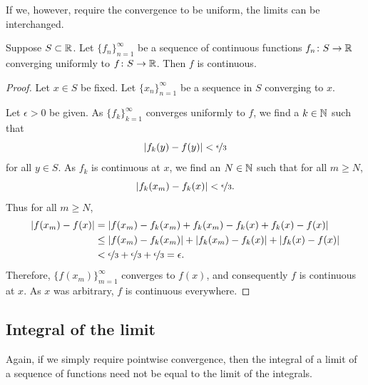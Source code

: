 If we, however, require the convergence to be uniform, the limits can
be interchanged.

\begin{thm}
Suppose $S \subset {\mathbb{R}}$.
Let $\{ f_n \}_{n=1}^\infty$ be 
a sequence of continuous functions $f_n \colon S \to {\mathbb{R}}$ converging
uniformly to  $f \colon S \to {\mathbb{R}}$.  Then $f$ is continuous.
\end{thm}

\begin{proof}
Let $x \in S$ be fixed.  Let $\{ x_n \}_{n=1}^\infty$ be a sequence in $S$
converging to $x$.

Let $\epsilon > 0$ be given.
As $\{ f_k \}_{k=1}^\infty$ converges uniformly to $f$, we find a $k \in {\mathbb{N}}$ such that
\begin{equation*}
\left\lvert {f_k(y)-f(y)} \right\rvert < \nicefrac{\epsilon}{3}
\end{equation*}
for all $y \in S$.  As $f_k$ is continuous at $x$,
we find an $N \in {\mathbb{N}}$ such that for all $m \geq N$,
\begin{equation*}
\left\lvert {f_k(x_m)-f_k(x)} \right\rvert < \nicefrac{\epsilon}{3} .
\end{equation*}
Thus for all
$m \geq N$,
\begin{equation*}
\begin{split}
\left\lvert {f(x_m)-f(x)} \right\rvert
& =
\left\lvert {f(x_m)-f_k(x_m)+f_k(x_m)-f_k(x)+f_k(x)-f(x)} \right\rvert
\\
& \leq
\left\lvert {f(x_m)-f_k(x_m)} \right\rvert+
\left\lvert {f_k(x_m)-f_k(x)} \right\rvert+
\left\lvert {f_k(x)-f(x)} \right\rvert
\\
& <
\nicefrac{\epsilon}{3} +
\nicefrac{\epsilon}{3} +
\nicefrac{\epsilon}{3} = \epsilon .
\end{split}
\end{equation*}
Therefore, $\bigl\{ f(x_m) \bigr\}_{m=1}^\infty$ converges to $f(x)$,
and consequently $f$ is continuous at $x$.
As $x$ was arbitrary, $f$ is continuous everywhere.
\end{proof}

\subsection{Integral of the limit}

Again, if we simply require pointwise convergence, then the integral
of a limit of a sequence of functions need not be equal to the limit
of the integrals.

